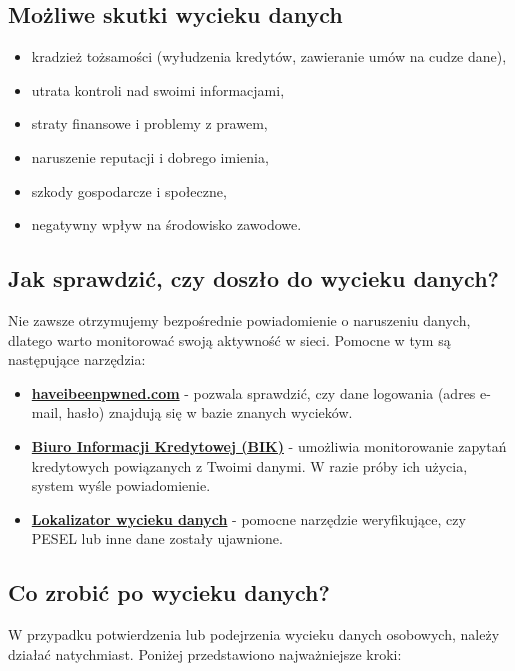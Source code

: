 \subsection{Możliwe skutki wycieku danych}
\begin{itemize}
    \item kradzież tożsamości (wyłudzenia kredytów, zawieranie umów na cudze dane),
    \item utrata kontroli nad swoimi informacjami,
    \item straty finansowe i problemy z prawem,
    \item naruszenie reputacji i dobrego imienia,
    \item szkody gospodarcze i społeczne,
    \item negatywny wpływ na środowisko zawodowe.
\end{itemize}

\subsection{Jak sprawdzić, czy doszło do wycieku danych?}

Nie zawsze otrzymujemy bezpośrednie powiadomienie o naruszeniu danych, dlatego warto monitorować swoją aktywność w sieci. Pomocne w tym są następujące narzędzia:

\begin{itemize}
    \item \textbf{\href{https://haveibeenpwned.com}{haveibeenpwned.com}} - pozwala sprawdzić, czy dane logowania (adres e-mail, hasło) znajdują się w bazie znanych wycieków.
    \item \textbf{\href{https://www.bik.pl/}{Biuro Informacji Kredytowej (BIK)}} - umożliwia monitorowanie zapytań kredytowych powiązanych z Twoimi danymi. W razie próby ich użycia, system wyśle powiadomienie.
    \item \textbf{\href{https://chronpesel.pl/}{Lokalizator wycieku danych}} - pomocne narzędzie weryfikujące, czy PESEL lub inne dane zostały ujawnione.
\end{itemize}

\subsection{Co zrobić po wycieku danych?}

W przypadku potwierdzenia lub podejrzenia wycieku danych osobowych, należy działać natychmiast. Poniżej przedstawiono najważniejsze kroki:

